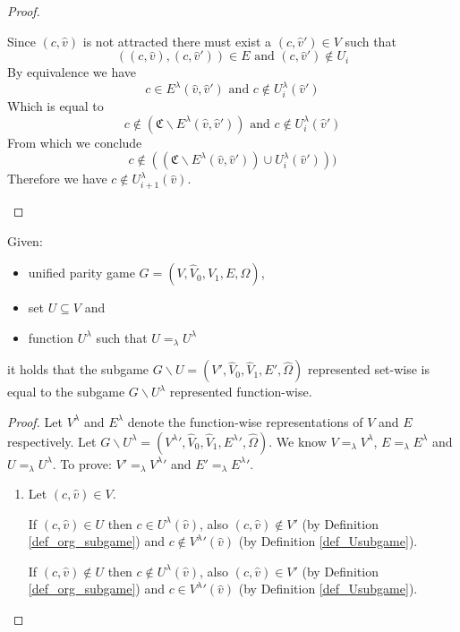 \begin{lemma}
\begin{proof}
\begin{itemize}
			Since $(c,\hat{v})$ is not attracted there must exist a $(c,\hat{v}') \in V$ such that 
			\[ ((c,\hat{v}),(c,\hat{v}')) \in E  \text{ and } (c,\hat{v}') \notin U_i \]
			By equivalence we have 
			\[ c \in E^\lambda(\hat{v},\hat{v}')  \text{ and } c \notin U^\lambda_i(\hat{v}') \]
			Which is equal to
			\[ c \notin (\mathfrak{C} \backslash E^\lambda(\hat{v},\hat{v}'))  \text{ and } c \notin U^\lambda_i(\hat{v}') \]
			From which we conclude
			\[ c \notin ((\mathfrak{C} \backslash E^\lambda(\hat{v},\hat{v}')) \cup U^\lambda_i(\hat{v}'))) \]
			Therefore we have $c \notin U^\lambda_{i+1}(\hat{v})$.
		\end{itemize}
	\end{proof}
\end{lemma}

\begin{lemma}
	\label{lem_subgame_eq}
	Given:
	\begin{itemize}
		\item unified parity game $G = ({V},\hat{V}_0,\hat{V}_1, {E}, \hat{\Omega})$,
		\item set ${U} \subseteq V$ and
		\item function $U^\lambda$ such that $U =_\lambda U^\lambda$
	\end{itemize}
it holds that the subgame $G \backslash {U} = ({V}',\hat{V}_0,\hat{V}_1,{E}',\hat{\Omega})$ represented set-wise is equal to the subgame $G\backslash U^\lambda$ represented function-wise.
	\begin{proof}
		Let  $V^\lambda$ and $E^\lambda$ denote the function-wise representations of $V$ and $E$ respectively. Let $G\backslash U^\lambda = ({V^\lambda}',\hat{V}_0,\hat{V}_1, {E^\lambda}', \hat{\Omega})$. We know $V =_\lambda V^\lambda$, $E =_\lambda E^\lambda$ and $U =_\lambda U^\lambda$. To prove: $V' =_\lambda {V^\lambda}'$ and $E' =_\lambda {E^\lambda}'$.
		
		\begin{enumerate}
			\item Let $(c,\hat{v}) \in V$.
			
			If $(c,\hat{v}) \in U$ then $c \in U^\lambda(\hat{v})$, also $(c,\hat{v}) \notin V'$ (by Definition \ref{def_org_subgame}) and $c \notin {V^\lambda}'(\hat{v})$ (by Definition \ref{def_Usubgame}).
			
			If $(c,\hat{v}) \notin U$ then $c \notin U^\lambda(\hat{v})$, also $(c,\hat{v}) \in V'$ (by Definition \ref{def_org_subgame}) and $c \in {V^\lambda}'(\hat{v})$ (by Definition \ref{def_Usubgame}).
			

\end{enumerate}
\end{proof}
\end{lemma}
